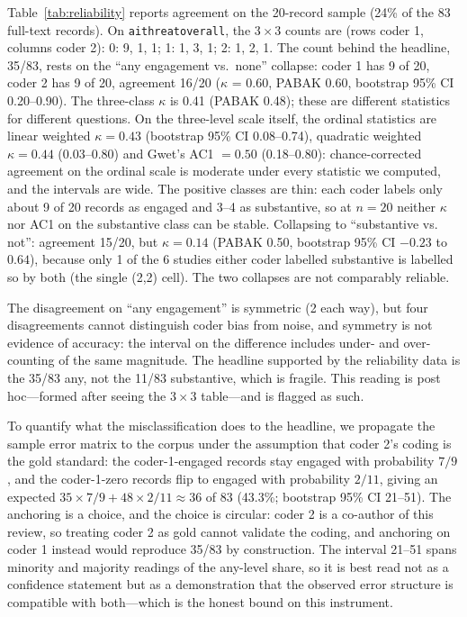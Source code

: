 \documentclass[preprint,12pt]{elsarticle}
\renewcommand{\_}{\plainunderscore\allowbreak}
\begin{document}
\label{sec:agreement}
Table~\ref{tab:reliability} reports agreement on the 20-record sample (24\% of the 83
full-text records). On \texttt{ai\_threat\_overall}, the $3\times3$ counts are (rows coder 1, columns coder 2):
0: 9, 1, 1; 1: 1, 3, 1; 2: 1, 2, 1. The count behind the headline, 35/83, rests on the
``any engagement vs.\ none'' collapse: coder 1 has 9 of 20, coder 2 has 9 of 20, agreement
16/20 ($\kappa$ = 0.60, PABAK 0.60, bootstrap 95\% CI 0.20--0.90). The three-class
$\kappa$ is 0.41 (PABAK 0.48); these are different statistics for different questions. On
the three-level scale itself, the ordinal statistics are
linear weighted $\kappa = 0.43$ (bootstrap 95\% CI 0.08--0.74), quadratic weighted
$\kappa = 0.44$ (0.03--0.80) and Gwet's AC1 $= 0.50$ (0.18--0.80): chance-corrected
agreement on the ordinal scale is moderate under every statistic we computed, and the
intervals are wide. The positive classes are thin: each coder labels only about 9 of 20
records as engaged and 3--4 as substantive, so at $n=20$ neither $\kappa$ nor AC1 on the
substantive class can be stable. Collapsing to ``substantive vs. not'': agreement 15/20, but
$\kappa = 0.14$ (PABAK 0.50, bootstrap 95\% CI $-0.23$ to $0.64$), because only 1 of the 6
studies either coder labelled substantive is labelled so by both (the single (2,2) cell).
The two collapses are not comparably reliable.

The disagreement on ``any engagement'' is symmetric (2 each way), but four disagreements
cannot distinguish coder bias from noise, and symmetry is not evidence of accuracy: the
interval on the difference includes under- and over-counting of the same magnitude. The
headline supported by the reliability data is the 35/83 any, not the 11/83 substantive,
which is fragile. This reading is post hoc---formed after seeing the $3\times3$ table---and
is flagged as such.

To quantify what the misclassification does to the headline, we propagate the sample error
matrix to the corpus under the assumption that coder 2's coding is the gold standard: the
coder-1-engaged records stay engaged with probability $7/9$, and the coder-1-zero records
flip to engaged with probability $2/11$, giving an expected $35 \times 7/9 + 48 \times
2/11 \approx 36$ of 83 (43.3\%; bootstrap 95\% CI 21--51). The anchoring is a choice,
and the choice is circular: coder 2 is a co-author of this review, so treating coder 2
as gold cannot validate the coding, and anchoring on coder 1 instead would reproduce
35/83 by construction. The interval 21--51 spans minority and majority readings of the
any-level share, so it is best read not as a confidence statement but as a demonstration
that the observed error structure is compatible with both---which is the honest bound on
this instrument.
\end{document}
